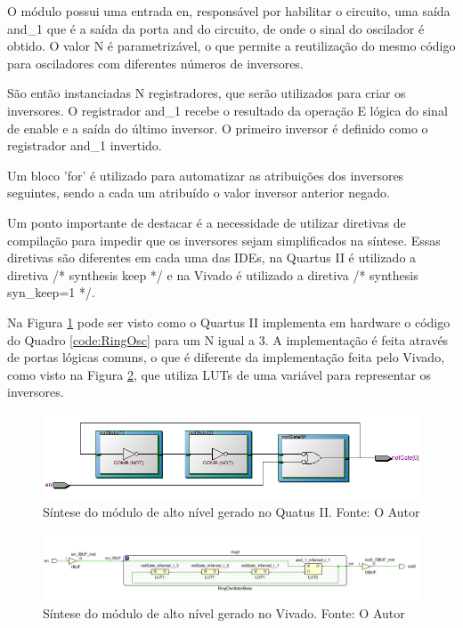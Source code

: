 O módulo possui uma entrada en, responsável por habilitar o circuito, uma saída and\_1 que é a saída da porta and do circuito, de onde o sinal do oscilador é obtido. O valor N é parametrizável, o que permite a reutilização do mesmo código para osciladores com diferentes números de inversores.

São então instanciadas N registradores, que serão utilizados para criar os inversores. O registrador and\_1 recebe o resultado da operação E lógica do sinal de enable e a saída do último inversor. O primeiro inversor é definido como o registrador and\_1 invertido.

Um bloco 'for' é utilizado para automatizar as atribuições dos inversores seguintes, sendo a cada um atribuído o valor inversor anterior negado.

Um ponto importante de destacar é a necessidade de utilizar diretivas de compilação para impedir que os inversores sejam simplificados na síntese. Essas diretivas são diferentes em cada uma das IDEs, na Quartus II é utilizado a diretiva /* synthesis keep */ e na Vivado é utilizado a diretiva /* synthesis syn\_keep=1 */.

Na Figura \ref{fig:DE2Imp3Osc} pode ser visto como o Quartus II implementa em hardware o código do Quadro \ref{code:RingOsc} para um N igual a 3. A implementação é feita através de portas lógicas comuns, o que é diferente da implementação feita pelo Vivado, como visto na Figura \ref{fig:ZedImp3Osc}, que utiliza LUTs de uma variável para representar os inversores.

\begin{figure}[H]
    \centering
    \includegraphics[width=\linewidth]{figures/Metodologia/DE2_Implementation_3Inverter_Gates.png}
    \caption{Síntese do módulo de alto nível gerado no Quatus II. Fonte: O Autor}
    \label{fig:DE2Imp3Osc}
\end{figure}

\begin{figure}[H]
    \centering
    \includegraphics[width=\linewidth]{figures/Metodologia/ZedBoard_Implementation_3Inverter.png}
    \caption{Síntese do módulo de alto nível gerado no Vivado. Fonte: O Autor}
    \label{fig:ZedImp3Osc}
\end{figure}


